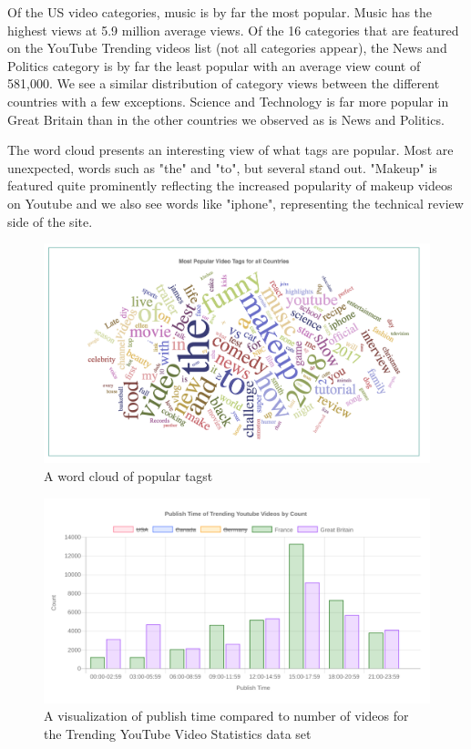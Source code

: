 \documentclass[journal]{vgtc}                %
\begin{document}
Of the US video categories, music is by far the most popular. Music has the highest views at 5.9 million average views. Of the 16 categories that are featured on the YouTube Trending videos list (not all categories appear), the News and Politics category is by far the least popular with an average view count of 581,000. We see a similar distribution of category views between the different countries with a few exceptions. Science and Technology is far more popular in Great Britain than in the other countries we observed as is News and Politics.

The word cloud presents an interesting view of what tags are popular. Most are unexpected, words such as "the" and "to", but several stand out. "Makeup" is featured quite prominently reflecting the increased popularity of makeup videos on Youtube and we also see words like "iphone", representing the technical review side of the site. 

\begin{figure}[tb]
	\centering %
	\includegraphics[width=1\columnwidth]{wordcloud}
	\caption{A word cloud of popular tagst}
	\label{fig:wordcloud}
\end{figure}


\begin{figure}[tb]
	\centering %
	\includegraphics[width=1\columnwidth]{publishtimevideocount}
	\caption{A visualization of publish time compared to number of videos for the Trending YouTube Video Statistics data set}
	\label{fig:publishtimevideocount}
\end{figure}
\end{document}
